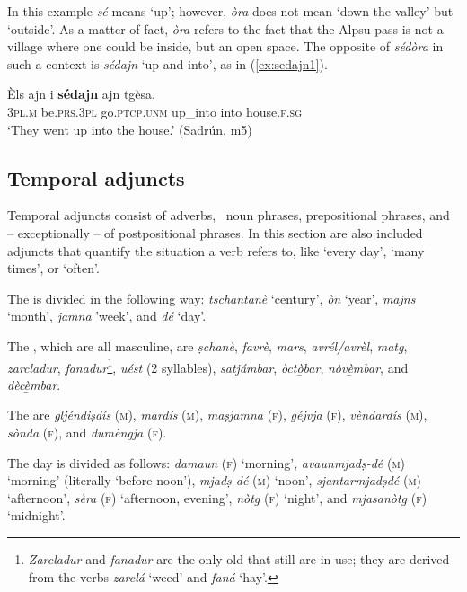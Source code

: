 In this example \textit{sé} means `up'; however, \textit{òra} does not mean `down the valley' but `outside'. As a matter of fact, \textit{òra} refers to the fact that the Alpsu pass is not a village where one could be inside, but an open space. The opposite of \textit{sédòra} in such a context is \textit{sédajn} `up and into', as in (\ref{ex:sedajn1}).

\ea
\label{ex:sedajn1}
\gll Èls ajn i \textbf{sédajn} ajn tgèsa.\\
\textsc{3pl.m} be.\textsc{prs.3pl} go.\textsc{ptcp.unm} up\_into into house.\textsc{f.sg}\\
\glt `They went up into the house.' (Sadrún, m5)
\z

\subsection{Temporal adjuncts}\label{sec:4.3.2}
Temporal adjuncts consist of adverbs, \
noun phrases, prepositional phrases, and -- exceptionally -- of postpositional phrases. In this section are also included adjuncts that quantify the situation a verb refers to, like `every day', `many times', or `often'.

The  is divided in the following way: \textit{tschantanè} `century', \textit{òn} `year', \textit{majns} `month', \textit{jamna} 'week', and \textit{dé} `day'.

The , which are all masculine, are \textit{ṣchanè}, \textit{favrè}, \textit{mars}, \textit{avrél/avrèl}, \textit{matg}, \textit{zarcladur}, \textit{fanadur}\footnote{\textit{Zarcladur} and \textit{fanadur} are the only old  that still are in use; they are derived from the verbs \textit{zarclá} `weed' and \textit{faná} `hay'.}, \textit{uést} (2 syllables), \textit{satjámbar}, \textit{òctò̱bar}, \textit{nò\-vè̱m\-bar}, and \textit{dècè̱mbar}.

The  are \textit{gljéndiṣdís} (\textsc{m}), \textit{mardís} \textsc{(m}), \textit{maṣjamna} (\textsc{f}), \textit{géjvja} (\textsc{f}), \textit{vèndardís} (\textsc{m}), \textit{sònda} (\textsc{f}), and \textit{dumèngja} (\textsc{f}).

The day is divided as follows: \textit{damaun} (\textsc{f}) `morning', \textit{avaunmjadṣ-dé} \textsc{(m}) `morning' (literally `before noon'), \textit{mjadṣ-dé} (\textsc{m}) `noon', \textit{sjantarmjadṣdé} (\textsc{m}) `afternoon', \textit{sèra} (\textsc{f}) `afternoon, evening', \textit{nòtg} (\textsc{f}) `night', and \textit{mjasanòtg} (\textsc{f}) `midnight'.

